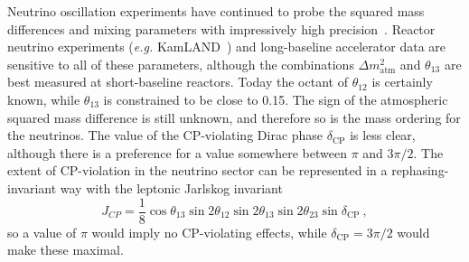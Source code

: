   Neutrino oscillation experiments have continued to probe the squared mass
  differences and mixing parameters with impressively high precision~\cite{}.
  Reactor neutrino experiments (\textit{e.g.} KamLAND~\cite{}) and long-baseline
  accelerator data are sensitive to all of these parameters, although the
  combinations $\Delta m^{2}_{\text{atm}}$ and $\theta_{13}$ are best measured
  at short-baseline reactors. Today the octant of $\theta_{12}$ is certainly
  known, while $\theta_{13}$ is constrained to be close to 0.15. The sign of the
  atmospheric squared mass difference is still unknown, and therefore so is the
  mass ordering for the neutrinos. The value of the CP-violating Dirac phase
  $\delta_{\text{CP}}$ is less clear, although there is a preference for a value
  somewhere between $\pi$ and $3\pi/2$. The extent of CP-violation in the
  neutrino sector can be represented in a rephasing-invariant way with the
  leptonic Jarlskog invariant
  \begin{equation}
    J_{CP} = \frac{1}{8} \cos \theta_{13} \sin 2\theta_{12} \sin 2\theta_{13} \sin 2\theta_{23} \sin \delta_{\text{CP}} \ ,
  \end{equation}
  so a value of $\pi$ would imply no CP-violating effects, while
  $\delta_{\text{CP}} = 3\pi/2$ would make these maximal.

